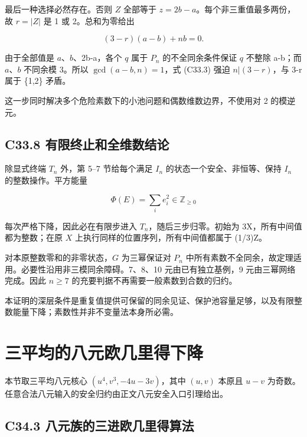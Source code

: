 {最后一种选择必然存在。否则} {\ensuremath{Z}} {全部等于} {\ensuremath{z=2b-a}。每个非三重值最多两份，故} {\ensuremath{r=|Z|}} {是} {1} {或} {2。总和为零给出}

\[
(3-r)(a-b)+nb=0.
\tag{C33.3}
\]

{由于全部值是} {\ensuremath{a}、\ensuremath{b}、2b-a，各个} {\ensuremath{q}} {属于} {\ensuremath{P_{n}}} {的不全同余条件保证} {\ensuremath{q}} {不整除} {a-b；而} {\ensuremath{a}、\ensuremath{b}} {不同余模} {3。所以} {\ensuremath{\operatorname{gcd}(a-b,n)=1}，式} {(C33.3)} {强迫} {\ensuremath{n|(3-r)}，与} {3-r} {属于} {\{1,2\}} {矛盾。}

{这一步同时解决多个危险素数下的小池问题和偶数维数边界，不使用对} {2} {的模逆元。}

\subsection*{\texorpdfstring{{C33.8} {有限终止和全维数结论}}{C33.8 有限终止和全维数结论}}\label{C33-h225}

{除显式终端} {\ensuremath{T_{n}}} {外，第} {5--7} {节给每个满足} {\ensuremath{I_{n}}} {的状态一个安全、非恒等、保持} {\ensuremath{I_{n}}} {的整数操作。平方能量}

\[
\Phi(E)=\sum_i e_i^2\in\mathbb Z_{\ge0}
\]

{每次严格下降，因此必在有限步进入} {\ensuremath{T_{n}}，随后三步归零。初始为} {3X，所有中间值都为整数；在原} {\ensuremath{X}} {上执行同样的位置序列，所有中间值都属于} {(1/3)Z。}

{对本原整数零和的非零状态，\ensuremath{G}} {为三幂保证对} {\ensuremath{P_{n}}} {中所有素数不全同余，故定理适用。必要性沿用非三模同余障碍。7、8、10} {元由已有独立基例，9} {元由三幂网络完成。因此} {\ensuremath{n\ge 7}} {的充要判据不再需要一般素数到合数的归约。}

{本证明的深层条件是重复值提供可保留的同余见证、保护池容量足够，以及有限整数能量下降；素数性并非不变量法本身所必需。}


\section{三平均的八元欧几里得下降}\label{construct:triple-small}
{本节取三平均八元核心} \((u^4,v^3,-4u-3v)\){，其中} \((u,v)\) {本原且} \(u-v\) {为奇数。任意合法八元输入的安全归约由正文八元安全入口引理给出。}

\subsection*{\texorpdfstring{{C34.3} {八元族的三进欧几里得算法}}{C34.3 八元族的三进欧几里得算法}}\label{C34-h226}

